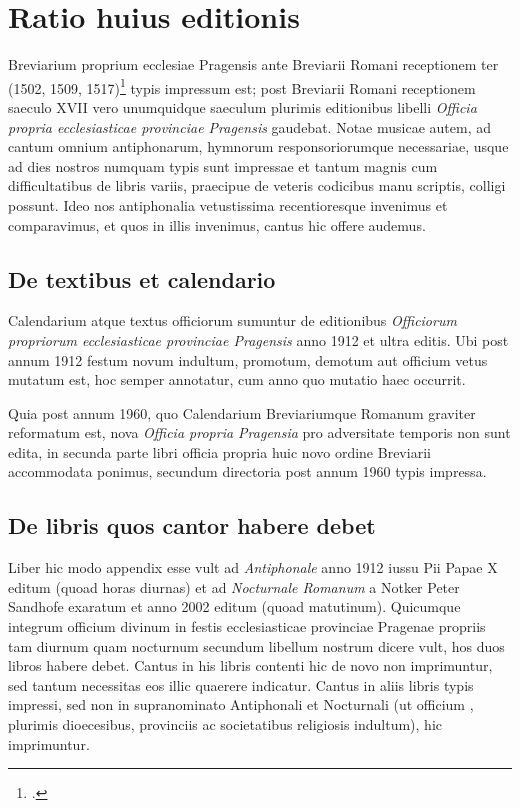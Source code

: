 \chapter*{Ratio huius editionis}

Breviarium proprium ecclesiae Pragensis
ante Breviarii Romani receptionem ter
(1502, 1509, 1517)\footcite[242]{bohatta}
typis impressum est; post Breviarii Romani receptionem
saeculo XVII vero unumquidque saeculum plurimis editionibus
libelli \emph{Officia propria ecclesiasticae provinciae Pragensis} gaudebat.
Notae musicae autem, ad cantum omnium antiphonarum, hymnorum
responsoriorumque necessariae,
usque ad dies nostros numquam typis sunt impressae
et tantum magnis cum difficultatibus de libris variis,
praecipue de veteris codicibus manu scriptis,
colligi possunt. Ideo nos antiphonalia vetustissima recentioresque
invenimus et comparavimus, et quos in illis invenimus,
cantus hic offere audemus.

\section*{De textibus et calendario}
Calendarium atque textus officiorum sumuntur de editionibus
\emph{Officiorum propriorum ecclesiasticae provinciae Pragensis}
anno 1912 et ultra editis.
Ubi post annum 1912 festum novum indultum, promotum, demotum
aut officium vetus mutatum est, hoc semper annotatur,
cum anno quo mutatio haec occurrit.

Quia post annum 1960, quo Calendarium Breviariumque Romanum
graviter reformatum est, nova \emph{Officia propria Pragensia}
pro adversitate temporis non sunt edita,
in secunda parte libri officia propria huic novo ordine Breviarii
accommodata ponimus, secundum directoria post annum 1960 typis
impressa.

\section*{De libris quos cantor habere debet}
Liber hic modo appendix esse vult ad \emph{Antiphonale}
anno 1912 iussu Pii Papae X editum (quoad horas diurnas) et
ad \emph{Nocturnale Romanum} a Notker Peter Sandhofe exaratum
et anno 2002 editum (quoad matutinum).
Quicumque integrum officium divinum in festis ecclesiasticae provinciae
Pragenae propriis tam diurnum quam nocturnum secundum
libellum nostrum dicere vult, hos duos libros habere debet.
Cantus in his libris contenti hic de novo non imprimuntur,
sed tantum necessitas eos illic quaerere indicatur.
Cantus in aliis libris typis impressi, sed non in supranominato
Antiphonali et Nocturnali (ut officium
, plurimis dioecesibus,
provinciis ac societatibus religiosis indultum), hic imprimuntur.

